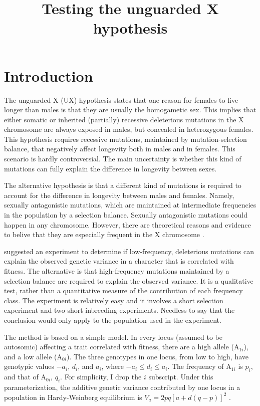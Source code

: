 \documentclass[a4paper,12pt]{article}
\title{Testing the unguarded X hypothesis}
\begin{document}
\maketitle
\section{Introduction}
The unguarded X (UX) hypothesis states that one reason for females to live longer than males is that they are usually the homogametic sex. This implies that either somatic or inherited (partially) recessive deleterious mutations in the X chromosome are always exposed in males, but concealed in heterozygous females. This hypothesis requires recessive mutations, maintained by mutation-selection balance, that negatively affect longevity both in males and in females. This scenario is hardly controversial. The main uncertainty is whether this kind of mutations can fully explain the difference in longevity between sexes.

The alternative hypothesis is that a different kind of mutations is required to account for the difference in longevity between males and females. Namely, sexually antagonistic mutations, which are maintained at intermediate frequencies in the population by a selection balance. Sexually antagonistic mutations could happen in any chromosome. However, there are theoretical reasons and evidence to belive that they are especially frequent in the X chromosome \citep{Gibson2002}.

\citet{Kelly1999} suggested an experiment to determine if low-frequency, deleterious mutations can explain the observed genetic variance in a character that is correlated with fitness. The alternative is that high-frequency mutations maintained by a selection balance are required to explain the observed variance. It is a qualitative test, rather than a quantitative measure of the contribution of each frequency class. The experiment is relatively easy and it involves a short selection experiment and two short inbreeding experiments. Needless to say that the conclusion would only apply to the population used in the experiment.

The method is based on a simple model. In every locus (assumed to be autosomic) affecting a trait correlated with fitness, there are a high allele (A$_{1i}$), and a low allele (A$_{0i}$). The three genotypes in one locus, from low to high, have genotypic values $-a_i$, $d_i$, and $a_i$, where $-a_i \leqslant d_i \leqslant a_i$. The frequency of A$_{1i}$ is $p_i$, and that of A$_{0i}$, $q_i$. For simplicity, I drop the $i$ subscript. Under this parameterization, the additive genetic variance contributed by one locus in a population in Hardy-Weinberg equilibrium is $V_a=2pq[a+d(q-p)]^2$ \citet[p. 126]{Falconer1989}.
\end{document}
